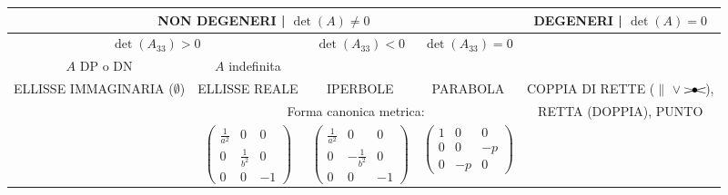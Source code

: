\documentclass[10pt]{article}
\theoremstyle{plain}
\begin{document}
\begin{table}[h!]
    \centering
    \begin{tabular}{c|c|c|c||c}
    \multicolumn{4}{c||}{NON DEGENERI | $\det(A) \neq 0$} & \multicolumn{1}{c}{DEGENERI | $\det(A) = 0$}\\\hline
    \multicolumn{2}{c|}{$\det(A_{33}) > 0$} & $\det(A_{33}) < 0$ & $\det(A_{33}) = 0$ & \\\cline{1 - 4}
    $A$ DP o DN & $A$ indefinita & & & \\
    ELLISSE IMMAGINARIA ($\emptyset$) & ELLISSE REALE & IPERBOLE & PARABOLA & COPPIA DI RETTE ($\|$ $\lor$ $\xcancel{\enspace \bullet \enspace}$), \\\cline{2-4}
    & \multicolumn{3}{c||}{Forma canonica metrica:} & RETTA (DOPPIA), PUNTO\\
    & $\begin{pmatrix}
        \frac{1}{a^2} & 0 & 0\\
        0 & \frac{1}{b^2} & 0\\
        0 & 0 & -1
    \end{pmatrix}$ & $\begin{pmatrix}
        \frac{1}{a^2} & 0 & 0\\
        0 & -\frac{1}{b^2} & 0\\
        0 & 0 & -1
    \end{pmatrix}$ &
    $\begin{pmatrix}
        1 & 0 & 0\\
        0 & 0 & -p\\
        0 & -p & 0
    \end{pmatrix}$ & 
    \end{tabular}
\end{table}
\end{document}
